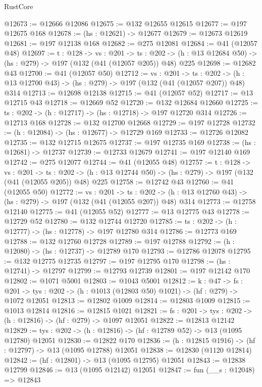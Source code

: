 \begin{lexlean}{RustCore}
\begin{coremodule}
@12673 := @12666 @12086
@12675 := @132 @12655 @12615
@12677 := @197 @12675 @168
@12678 := (hs : @12621) -> @12677
@12679 := @12673 @12619
@12681 := @197 @12138 @168
@12682 := @275 @12081
@12684 := @41 (@12057 @48)
@12697 := {t : @128} ->
  {vs : @201} ->
  {ts : @202} -> (h : @13 @12684 @50) -> (hs : @279) -> @197 (@132 (@41 (@12057 @205)) @48) @225
@12698 := @12682 @43
@12700 := @41 (@12057 @50)
@12712 := {vs : @201} ->
  {ts : @202} -> (h : @13 @12700 @43) -> (hs : @279) -> @197 (@132 (@41 (@12057 @207)) @48) @314
@12713 := @12698 @12138
@12715 := @41 (@12057 @52)
@12717 := @13 @12715 @43
@12718 := @12669 @52
@12720 := @132 @12684 @12660
@12725 := {ts : @202} -> (h : @12717) -> (hs : @12718) -> @197 @12720 @314
@12726 := @12713 @168
@12728 := @132 @12700 @12668
@12729 := @197 @12728
@12732 := (h : @12084) -> (hs : @12677) -> @12729 @169
@12733 := @12726 @12082
@12735 := @132 @12715 @12675
@12737 := @197 @12735 @169
@12738 := (hs : @12681) -> @12737
@12739 := @12733 @12679
@12741 := @197 @12140 @169
@12742 := @275 @12077
@12744 := @41 (@12055 @48)
@12757 := {t : @128} ->
  {vs : @201} ->
  {ts : @202} -> (h : @13 @12744 @50) -> (hs : @279) -> @197 (@132 (@41 (@12055 @205)) @48) @225
@12758 := @12742 @43
@12760 := @41 (@12055 @50)
@12772 := {vs : @201} ->
  {ts : @202} -> (h : @13 @12760 @43) -> (hs : @279) -> @197 (@132 (@41 (@12055 @207)) @48) @314
@12773 := @12758 @12140
@12775 := @41 (@12055 @52)
@12777 := @13 @12775 @43
@12778 := @12729 @52
@12780 := @132 @12744 @12720
@12785 := {ts : @202} -> (h : @12777) -> (hs : @12778) -> @197 @12780 @314
@12786 := @12773 @169
@12788 := @132 @12760 @12728
@12789 := @197 @12788
@12792 := (h : @12080) -> (hs : @12737) -> @12789 @170
@12793 := @12786 @12078
@12795 := @132 @12775 @12735
@12797 := @197 @12795 @170
@12798 := (hs : @12741) -> @12797
@12799 := @12793 @12739
@12801 := @197 @12142 @170
@12802 := @1071 @5001
@12803 := @1043 @5001
@12812 := {k : @47} ->
  {fs : @201} -> {tys : @202} -> (h : @1013 (@12803 @50) @1021) -> (hf : @279) -> @1072 @12051
@12813 := @12802 @1009
@12814 := @12803 @1009
@12815 := @1013 @12814
@12816 := @12815 @1021
@12821 := {fs : @201} -> {tys : @202} -> (h : @12816) -> (hf : @279) -> @1097 @12051
@12822 := @12813 @12142
@12829 := {tys : @202} -> (h : @12816) -> (hf : @12789 @52) -> @13 (@1095 @12780) @12051
@12830 := @12822 @170
@12836 := (h : @12815 @1916) -> (hf : @12797) -> @13 (@1095 @12788) @12051
@12838 := @12830 (@1120 @12814)
@12842 := (hf : @12801) -> @13 (@1095 @12795) @12051
@12843 := @12838 @12799
@12846 := @13 (@1095 @12142) @12051
@12847 := fun (__s : @12048) => @12843

\end{coremodule}
\end{lexlean}
